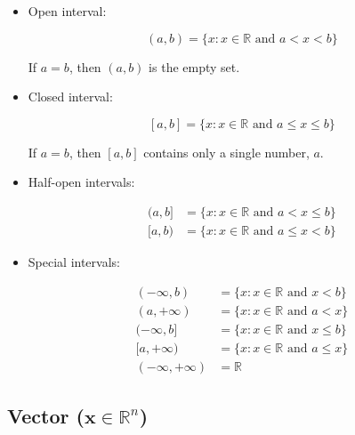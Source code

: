 \documentclass[titlepage]{article}
\begin{document}
        \begin{itemize}
          \item Open interval:

                $$(a, b) = \{x : x \in \mathbb{R} \text{ and } a < x < b \}$$

                If $a = b$, then $(a, b)$ is the empty set.

          \item Closed interval:

                $$
                  [a, b]
                    = \{x : x \in \mathbb{R} \text{ and } a \leq x \leq b \}
                $$

                If $a = b$, then $[a, b]$ contains only a single number,
                $a$.

          \item Half-open intervals:

                \begin{align*}
                  (a, b]
                    & = \{x : x \in \mathbb{R} \text{ and } a < x \leq b \} \\
                  [a, b)
                    & = \{x : x \in \mathbb{R} \text{ and } a \leq x < b \}
                \end{align*}

          \item Special intervals:

                \begin{align*}
                  (-\infty, b)
                    & = \{x : x \in \mathbb{R} \text{ and } x < b\} \\
                  (a, +\infty)
                    & = \{x : x \in \mathbb{R} \text{ and } a < x\} \\
                  (-\infty, b]
                    & = \{x : x \in \mathbb{R} \text{ and } x \leq b\} \\
                  [a, +\infty)
                    & = \{x : x \in \mathbb{R} \text{ and } a \leq x\} \\
                  (-\infty, +\infty) & = \mathbb{R}
                \end{align*}
        \end{itemize}

      \subsection{Vector ($\mathbf{x} \in \mathbb{R}^n$)}
\end{document}
